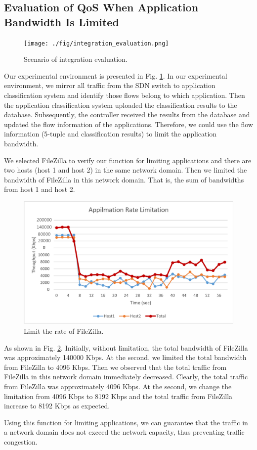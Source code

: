 \subsection{Evaluation of QoS When Application Bandwidth Is Limited}

\begin{figure}[!t]
\centering
\texttt{[image: ./fig/integration\_evaluation.png]}
\caption{Scenario of integration evaluation.}
\label{fig:integration_evaluation}
\end{figure}


Our experimental environment is presented in Fig. \ref{fig:integration_evaluation}.
In our experimental environment, we mirror all traffic from the SDN switch to application classification system and identify those flows belong to which application.
Then the application classification system uploaded the classification results to the database.
Subsequently, the controller received the results from the database and updated the flow information of the applications.
Therefore, we could use the flow information (5-tuple and classification results) to limit the application bandwidth.

We selected FileZilla to verify our function for limiting applications and there are two hosts (host 1 and host 2) in the same network domain.
Then we limited the bandwidth of FileZilla in this network domain.
That is, the sum of bandwidths from host 1 and host 2.

\begin{figure}[!t]
\centering
\includegraphics[width=\textwidth]{./fig/integration_app_filezilla.png}
\caption{Limit the rate of FileZilla.}
\label{fig:integration_app_filezilla}
\end{figure}

As shown in Fig. \ref{fig:integration_app_filezilla}.
Initially, without limitation, the total bandwidth of FileZilla was approximately 140000 Kbps.
At the  second, we limited the total bandwidth from FileZilla to 4096 Kbps.
Then we observed that the total traffic from FileZilla in this network domain immediately decreased.
Clearly, the total traffic from FileZilla was approximately 4096 Kbps.
At the  second, we change the limitation from 4096 Kbps to 8192 Kbps and the total traffic from FileZilla increase to 8192 Kbps as expected.

Using this function for limiting applications, we can guarantee that the traffic in a network domain does not exceed the network capacity, thus preventing traffic congestion.
